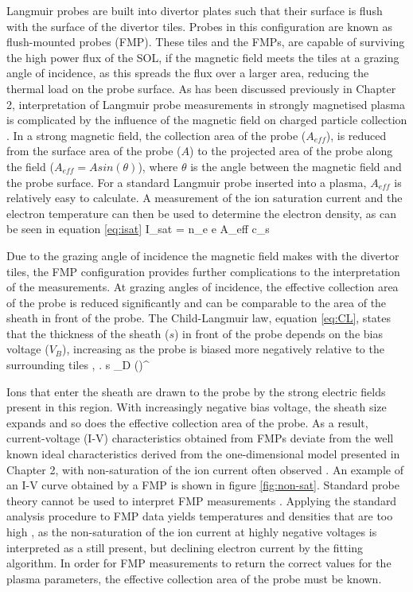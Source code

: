 Langmuir probes are built into divertor plates such that their surface is flush with the surface of the divertor tiles. Probes in this configuration are known as flush-mounted probes (FMP). These tiles and the FMPs, are capable of surviving the high power flux of the SOL, if the magnetic field meets the tiles at a grazing angle of incidence, as this spreads the flux over a larger area, reducing the thermal load on the probe surface. As has been discussed previously in Chapter 2, interpretation of Langmuir probe measurements in strongly magnetised plasma is complicated by the influence of the magnetic field on charged particle collection \cite{Stangeby}. In a strong magnetic field, the collection area of the probe ($A_{eff}$), is reduced from the surface area of the probe ($A$) to the projected area of the probe along the field ($A_{eff} = A sin(\theta)$), where $\theta$ is the angle between the magnetic field and the probe surface. For a standard Langmuir probe inserted into a plasma, $A_{eff}$ is relatively easy to calculate. A measurement of the ion saturation current and the electron temperature can then be used to determine the electron density, as can be seen in equation \ref{eq:isat}
\be 
I_{sat} = n_e e A_{eff} c_s
\label{eq:isat}
\ee

Due to the grazing angle of incidence the magnetic field makes with the divertor tiles, the FMP configuration provides further complications to the interpretation of the measurements. At grazing angles of incidence, the effective collection area of the probe is reduced significantly and can be comparable to the area of the sheath in front of the probe. The Child-Langmuir law, equation \ref{eq:CL}, states that the thickness of the sheath ($s$) in front of the probe depends on the bias voltage ($V_B$), increasing as the probe is biased more negatively relative to the surrounding tiles \cite{child}, \cite{childL}. 
\be
s \propto \lambda_D {\left(\right)}^
\label{eq:CL}
\ee

Ions that enter the sheath are drawn to the probe by the strong electric fields present in this region. With increasingly negative bias voltage, the sheath size expands and so does the effective collection area of the probe. As a result, current-voltage (I-V) characteristics obtained from FMPs deviate from the well known ideal characteristics derived from the one-dimensional model presented in Chapter 2, with non-saturation of the ion current often observed \cite{Gunn-1995}. An example of an I-V curve obtained by a FMP is shown in figure \ref{fig:non-sat}. Standard probe theory cannot be used to interpret FMP measurements \cite{FMP_tilt}.   Applying the standard analysis procedure to FMP data yields temperatures and densities that are too high \cite{tilting}, as the non-saturation of the ion current at highly negative voltages is interpreted as a still present, but declining electron current by the fitting algorithm. In order for FMP measurements to return the correct values for the plasma parameters, the effective collection area of the probe must be known. 

